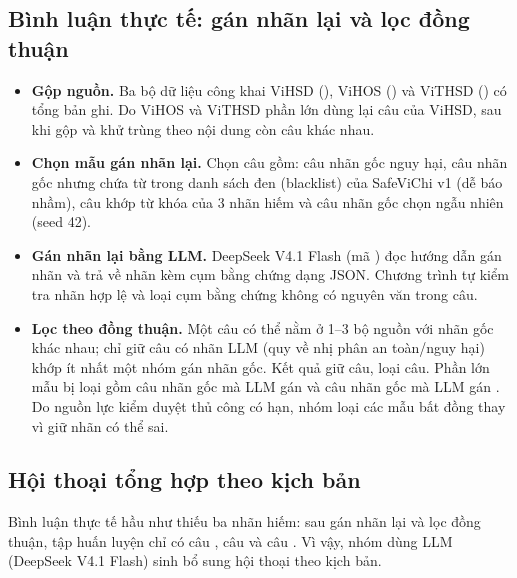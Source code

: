 \subsection{Bình luận thực tế: gán nhãn lại và lọc đồng thuận}
\label{sec:p1-that}

\begin{itemize}
  \item \textbf{Gộp nguồn.} Ba bộ dữ liệu công khai ViHSD (), ViHOS () và ViTHSD
        () có tổng  bản ghi. Do ViHOS và ViTHSD phần lớn dùng lại câu của
        ViHSD, sau khi gộp và khử trùng theo nội dung còn  câu khác nhau.
  \item \textbf{Chọn mẫu gán nhãn lại.} Chọn  câu gồm:
         câu nhãn gốc nguy hại,  câu nhãn gốc  nhưng chứa
        từ trong danh sách đen (blacklist) của SafeViChi v1 (dễ báo nhầm),  câu khớp từ khóa
        của 3 nhãn hiếm và  câu nhãn gốc  chọn ngẫu nhiên (seed 42).
  \item \textbf{Gán nhãn lại bằng LLM.} DeepSeek V4.1 Flash (mã \texttt{}) đọc hướng dẫn gán nhãn và
        trả về nhãn kèm cụm bằng chứng dạng JSON. Chương trình tự kiểm tra nhãn hợp lệ và loại
        cụm bằng chứng không có nguyên văn trong câu.
  \item \textbf{Lọc theo đồng thuận.} Một câu có thể nằm ở 1--3 bộ nguồn với nhãn gốc khác nhau; chỉ
        giữ câu có nhãn LLM (quy về nhị phân an toàn/nguy hại) khớp ít nhất một nhóm gán nhãn gốc. Kết
        quả giữ  câu, loại  câu. Phần lớn mẫu bị loại gồm
         câu nhãn gốc  mà LLM gán  và 
        câu nhãn gốc  mà LLM gán . Do nguồn lực kiểm duyệt thủ công có hạn, nhóm
        loại các mẫu bất đồng thay vì giữ nhãn có thể sai.
\end{itemize}

\subsection{Hội thoại tổng hợp theo kịch bản}
\label{sec:p1-sinh}

Bình luận thực tế hầu như thiếu ba nhãn hiếm: sau gán nhãn lại và lọc đồng thuận, tập huấn luyện chỉ
có  câu ,  câu  và  câu . Vì
vậy, nhóm dùng LLM (DeepSeek V4.1 Flash) sinh bổ sung hội thoại theo kịch bản.

